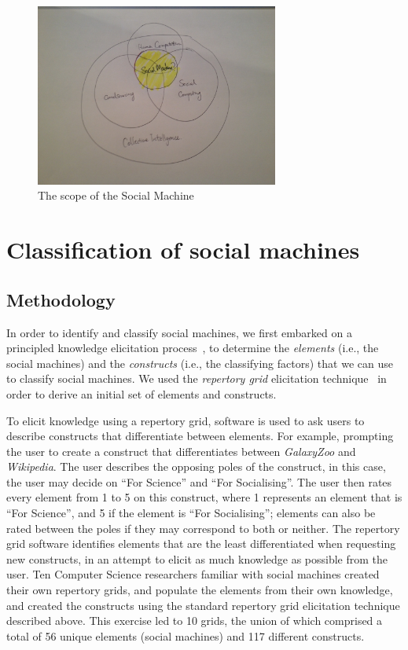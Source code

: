 \documentclass{sig-alternate}
\begin{document}
\begin{figure}[htb]
\begin{center}
\includegraphics[width=8cm]{img/socialmachine.JPG}
\caption{The scope of the Social Machine} \label{social machine}
\end{center}
\end{figure}

\section{Classification of social machines}

\subsection{Methodology}

In order to identify and classify social machines, we first embarked on a principled
knowledge elicitation process~\cite{knowledgeelicitation}, to determine the {\it elements}
(i.e., the social machines) and the {\it constructs} (i.e., the classifying factors) that
we can use to classify social machines. We used the {\it repertory grid} elicitation
technique~\cite{kelly} in order to derive an initial set of elements and constructs.

To elicit knowledge using a repertory grid, software is used to ask users to describe constructs
that differentiate between elements. For example, prompting the user to create a construct that
differentiates between {\it GalaxyZoo} and {\it Wikipedia}. The user describes the opposing poles of 
the construct, in this case, the user may decide on ``For Science'' and ``For Socialising''. The
user then rates every element from 1 to 5 on this construct, where 1 represents an element that is
``For Science'', and 5 if the element is ``For Socialising''; elements can also be rated between
the poles if they may correspond to both or neither. The repertory grid software identifies
elements that are the least differentiated when requesting new constructs, in an attempt to
elicit as much knowledge as possible from the user. Ten Computer Science researchers familiar with social machines created their own
repertory grids, and populate the elements from their own knowledge, and created the
constructs using the standard repertory grid elicitation technique described above. This exercise led
to 10 grids, the union of which comprised a total of 56 unique elements (social machines)
and 117 different constructs.
\end{document}
